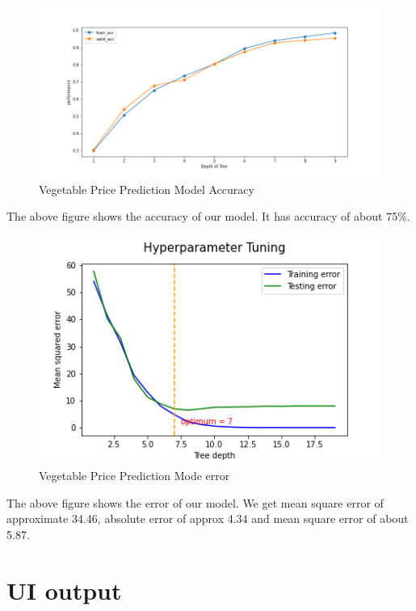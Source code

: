 \begin{figure}[H]
	\centering
	\includegraphics[width=160mm]{images/accuracy.png}
	\caption{Vegetable Price Prediction Model Accuracy} %
	\label{figresult2} %
\end{figure}
The above figure shows the accuracy of our model. It has accuracy of about 75\%.

\begin{figure}[H]
	\centering
	\includegraphics[width=140mm]{images/error.png}
	\caption{Vegetable Price Prediction Mode error} %
	\label{result3} %
\end{figure}
The above figure shows the error of our model. We get mean square error of approximate 34.46, absolute error of approx 4.34 and mean square error of about 5.87.

\section{UI output}

